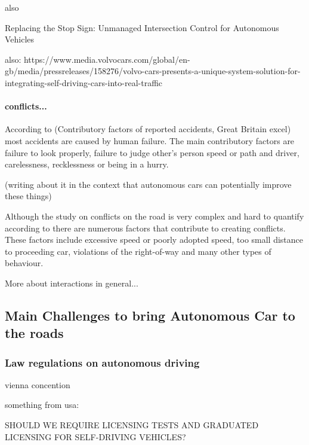 \documentclass[11pt,english]{article}
\begin{document}
also

Replacing the Stop Sign: Unmanaged Intersection Control
for Autonomous Vehicles

also:
https://www.media.volvocars.com/global/en-gb/media/pressreleases/158276/volvo-cars-presents-a-unique-system-solution-for-integrating-self-driving-cars-into-real-traffic


\paragraph{conflicts...}

\citep{parkin2016understanding}

According to (Contributory factors of reported accidents, Great Britain excel) most accidents are caused by human failure. The main contributory factors are failure to look properly, failure to judge other's person speed or path and driver, carelessness, recklessness or being in a hurry.



(writing about it in the context that autonomous cars can potentially improve these things) 


Although the study on conflicts on the road is very complex and hard to quantify according to \citep{risser1985behavior} there are numerous factors that contribute to creating conflicts. These factors include excessive speed or poorly adopted speed, too small distance to proceeding car, violations of the right-of-way and many other types of behaviour. 


More about interactions in general...



\subsection{Main Challenges to bring Autonomous Car to the roads}

\subsubsection{Law regulations on autonomous driving}

vienna concention


something from usa:


SHOULD WE REQUIRE LICENSING TESTS AND GRADUATED LICENSING FOR SELF-DRIVING VEHICLES?
\end{document}
